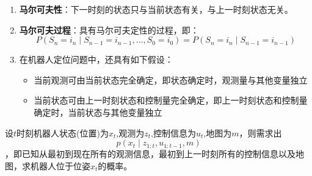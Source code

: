\documentclass[../main.tex]{subfiles}
\begin{document}
\begin{enumerate}
\begin{enumerate}
        \item \textbf{马尔可夫性}：下一时刻的状态只与当前状态有关，与上一时刻状态无关。
        \item \textbf{马尔可夫过程}：具有马尔可夫定性的过程，即：
        $$ P\left( {{S}_{n} = {i}_{n} \mid  {S}_{n - 1} = {i}_{n - 1},\ldots ,{S}_{0} = {i}_{0}}\right)  = P\left( {{S}_{n} = {i}_{n} \mid  {S}_{n - 1} = {i}_{n - 1}}\right) $$
        \item 在机器人定位问题中，还具有如下假设：
            \begin{itemize}
                \item 当前观测可由当前状态完全确定，即状态确定时，观测量与其他变量独立
                \item 当前状态可由上一时刻状态和控制量完全确定，即上一时刻状态和控制量确定时，当前状态与其他变量独立
            \end{itemize}
        \end{enumerate}
        设$t$时刻机器人状态(位置)为$x_t$,观测为$z_t$,控制信息为$u_t$,地图为$m$，则需求出
        $$p(x_t\mid z_{1:t},u_{1:t-1},m)$$
        ，即已知从最初到现在所有的观测信息，最初到上一时刻所有的控制信息以及地图，求机器人位于位姿$x_t$的概率。
        



    \end{enumerate}

\newpage
\end{document}
